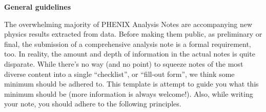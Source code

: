 \documentclass[12pt]{article}
\begin{document}
\vspace{1.0in}
{\large {\bf General guidelines}}
\vspace{0.5in}

The overwhelming majority of PHENIX Analysis Notes are accompanying
new physics results extracted from data.  Before making them public,
as preliminary or final, the submission of a comprehensive analysis
note is a formal requirement, too.  In reality, the amount and depth
of information in the actual notes is quite disparate.  While there's
no way (and no point) to squeeze notes of the most diverse content
into a single ``checklist'', or ``fill-out form'', we think some
minimum should be adhered to.  This template is attempt to guide you
what this minimum should be (more information is always welcome!).
Also, while writing your note, you should adhere to the 
following principles.
\end{document}
